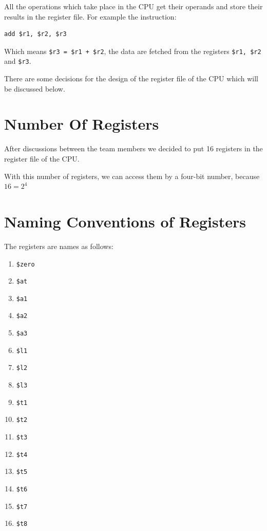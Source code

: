 \documentclass[12pt, dvipsnames, svgnames, x11names, oneside]{book}
\begin{document}
		All the operations which take place in the CPU get their operands and store their results in the register file. For example the instruction:
		
		\begin{lstlisting}
add $r1, $r2, $r3
		\end{lstlisting}
		
		\noindent Which means \texttt{\$r3 = \$r1 + \$r2}, the data are fetched from the registers \texttt{\$r1, \$r2} and \texttt{\$r3}.
		
		There are some decisions for the design of the register file of the CPU which will be discussed below.
		
		\section{Number Of Registers}\label{sec:num-of-regs}
		After discussions between the team members we decided to put 16 registers in the register file of the CPU.
		
		With this number of registers, we can access them by a four-bit number, because $16 = 2^4$
		
		\section{Naming Conventions of Registers}\label{sec:name-of-regs}
		The registers are names as follows:
		\begin{enumerate}
			\item \texttt{\$zero}
			\item \texttt{\$at}
			\item \texttt{\$a1}
			\item \texttt{\$a2}
			\item \texttt{\$a3}
			\item \texttt{\$l1}
			\item \texttt{\$l2}
			\item \texttt{\$l3}
			\item \texttt{\$t1}
			\item \texttt{\$t2}
			\item \texttt{\$t3}
			\item \texttt{\$t4}
			\item \texttt{\$t5}
			\item \texttt{\$t6}
			\item \texttt{\$t7}
			\item \texttt{\$t8}
		\end{enumerate}
		
\end{document}
